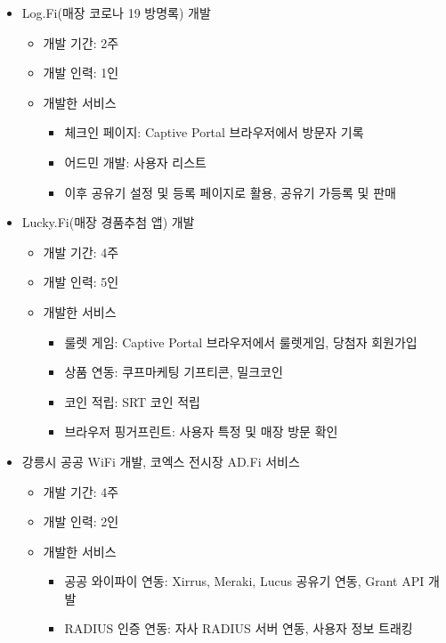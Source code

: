 \begin{itemize}
\begin{itemize}[label=$\star$]
\begin{itemize}
		            \end{itemize}
	      \end{itemize}
	\item Log.Fi(매장 코로나 19 방명록) 개발
	      \begin{itemize}[label=$\star$]
		      \item 개발 기간: 2주
		      \item 개발 인력: 1인
		      \item 개발한 서비스
		            \begin{itemize}
			            \item 체크인 페이지: Captive Portal 브라우저에서 방문자 기록
			            \item 어드민 개발: 사용자 리스트
			            \item 이후 공유기 설정 및 등록 페이지로 활용, 공유기 가등록 및 판매
		            \end{itemize}
	      \end{itemize}
	\item Lucky.Fi(매장 경품추첨 앱) 개발
	      \begin{itemize}[label=$\star$]
		      \item 개발 기간: 4주
		      \item 개발 인력: 5인
		      \item 개발한 서비스
		            \begin{itemize}
			            \item 룰렛 게임: Captive Portal 브라우저에서 룰렛게임, 당첨자 회원가입
			            \item 상품 연동: 쿠프마케팅 기프티콘, 밀크코인
			            \item 코인 적립: SRT 코인 적립
			            \item 브라우저 핑거프린트: 사용자 특정 및 매장 방문 확인
		            \end{itemize}
	      \end{itemize}
	\item 강릉시 공공 WiFi 개발, 코엑스 전시장 AD.Fi 서비스
	      \begin{itemize}[label=$\star$]
		      \item 개발 기간: 4주
		      \item 개발 인력: 2인
		      \item 개발한 서비스
		            \begin{itemize}
			            \item 공공 와이파이 연동: Xirrus, Meraki, Lucus 공유기 연동, Grant API 개발
			            \item RADIUS 인증 연동: 자사 RADIUS 서버 연동, 사용자 정보 트래킹

\end{itemize}
\end{itemize}
\end{itemize}
